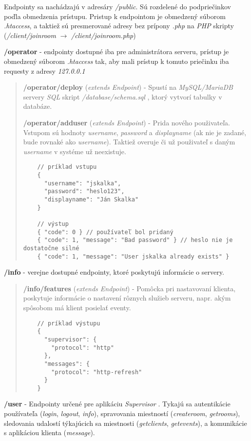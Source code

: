 \documentclass{article}
\newcommand{\filedesc}[1]{\vspace{0.3cm} \noindent \textbf{#1}}
\newcommand{\file}[1]{\emph{#1}}
\begin{document}
Endpointy sa nachádzajú v adresáry \emph{/public}. Sú rozdelené do podpriečinkov poďla obmedzenia prístupu. Pristup k endpointom je obmedzený súborom \emph{.htaccess}, a taktiež sú presmerované adresy bez prípony \emph{.php} na \emph{PHP} skripty (\emph{/client/joinroom} $\rightarrow$ \emph{/client/joinroom.php})

\filedesc{/operator} - endpointy dostupné iba pre administrátora serveru, prístup je obmedzený súborom \emph{.htaccess} tak, aby mali prístup k tomuto priečinku iba requesty z adresy \emph{127.0.0.1}

\begin{quote}
  \filedesc{/operator/deploy} (\emph{extends Endpoint}) - Spustí na \emph{MySQL/MariaDB} servery \emph{SQL} skript \file{/database/schema.sql} , ktorý vytvorí tabulky v databáze.
  
  \filedesc{/operator/adduser} (\emph{extends Endpoint}) - Prida nového použivateľa. Vstupom sú hodnoty \emph{username}, \emph{password} a \emph{displayname} (ak nie je zadané, bude rovnaké ako \emph{username}). Taktiež overuje či už použivateľ s daným \emph{username} v systéme už neexistuje.

  \begin{verbatim}
    // príklad vstupu
    {
      "username": "jskalka",
      "password": "heslo123",
      "displayname": "Ján Skalka"
    }

    // výstup
    { "code": 0 } // používateľ bol pridaný
    { "code": 1, "message": "Bad password" } // heslo nie je dostatočne silné
    { "code": 1, "message": "User jskalka already exists" }
  \end{verbatim}
\end{quote}

\filedesc{/info} - verejne dostupné endpointy, ktoré poskytujú informácie o servery.

\begin{quote}
  \filedesc{/info/features} (\emph{extends Endpoint}) - Pomôcka pri nastavovaní klienta, poskytuje informácie o nastavení rôznych služieb serveru, napr. akým spôsobom má klient posielať eventy.
  \begin{verbatim}
    // príklad výstupu
    {
      "supervisor": {
        "protocol": "http"
      },
      "messages": {
        "protocol": "http-refresh"
      }
    }
  \end{verbatim}
\end{quote}

\filedesc{/user} - Endpointy určené pre aplikáciu \emph{Supervisor} . Tykajú sa autentikácie používateľa (\emph{login}, \emph{logout}, \emph{info}), spravovania miestností (\emph{createroom}, \emph{getrooms}), sledovania udalostí týkajúcich sa miestnosti (\emph{getclients}, \emph{getevents}), a komunikácie s aplikáciou klienta (\emph{message}).
\end{document}
